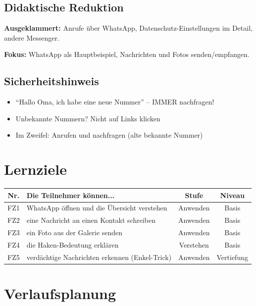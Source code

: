 \documentclass[11pt,a4paper]{article}
\begin{document}
\subsection{Didaktische Reduktion}
\textbf{Ausgeklammert:} Anrufe über WhatsApp, Datenschutz-Einstellungen im Detail, andere Messenger.

\textbf{Fokus:} WhatsApp als Hauptbeispiel, Nachrichten und Fotos senden/empfangen.

\subsection{Sicherheitshinweis}
\begin{warnbox}
\begin{itemize}
    \item ``Hallo Oma, ich habe eine neue Nummer'' -- IMMER nachfragen!
    \item Unbekannte Nummern? Nicht auf Links klicken
    \item Im Zweifel: Anrufen und nachfragen (alte bekannte Nummer)
\end{itemize}
\end{warnbox}

\section{Lernziele}

\begin{tabular}{|c|p{7cm}|c|c|}
\hline
\textbf{Nr.} & \textbf{Die Teilnehmer können...} & \textbf{Stufe} & \textbf{Niveau} \\
\hline
FZ1 & WhatsApp öffnen und die Übersicht verstehen & Anwenden & Basis \\
FZ2 & eine Nachricht an einen Kontakt schreiben & Anwenden & Basis \\
FZ3 & ein Foto aus der Galerie senden & Anwenden & Basis \\
FZ4 & die Haken-Bedeutung erklären & Verstehen & Basis \\
FZ5 & verdächtige Nachrichten erkennen (Enkel-Trick) & Anwenden & Vertiefung \\
\hline
\end{tabular}

\section{Verlaufsplanung}
\end{document}
